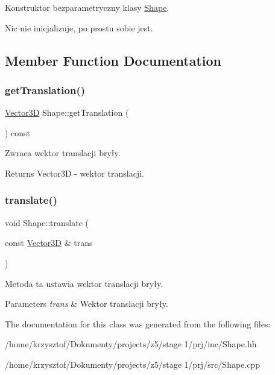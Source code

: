 Konstruktor bezparametryczny klasy \hyperlink{class_shape}{Shape}. 

Nic nie inicjalizuje, po prostu sobie jest. 

\subsection{Member Function Documentation}
\mbox{\label{class_shape_a8eadd85a6f07570cab972bd4d22fe835}} 
\subsubsection{\texorpdfstring{get\+Translation()}{getTranslation()}}
{\footnotesize\ttfamily \hyperlink{class_vector}{Vector3D} Shape\+::get\+Translation (\begin{DoxyParamCaption}{ }\end{DoxyParamCaption}) const\hspace{0.3cm}{\ttfamily [inline]}}



Zwraca wektor translacji bryły. 

\begin{DoxyReturn}{Returns}
Vector3D -\/ wektor translacji. 
\end{DoxyReturn}
\mbox{\label{class_shape_a87f2bd8b0e83a3d30cb94a13c150823f}} 
\subsubsection{\texorpdfstring{translate()}{translate()}}
{\footnotesize\ttfamily void Shape\+::translate (\begin{DoxyParamCaption}\item[{const \hyperlink{class_vector}{Vector3D} \&}]{trans }\end{DoxyParamCaption})\hspace{0.3cm}{\ttfamily [inline]}}



Metoda ta ustawia wektor translacji bryły. 


\begin{DoxyParams}{Parameters}
{\em trans} & Wektor translacji bryły. \\
\hline
\end{DoxyParams}


The documentation for this class was generated from the following files\+:\begin{DoxyCompactItemize}
\item 
/home/krzysztof/\+Dokumenty/projects/z5/stage 1/prj/inc/Shape.\+hh\item 
/home/krzysztof/\+Dokumenty/projects/z5/stage 1/prj/src/Shape.\+cpp\end{DoxyCompactItemize}
